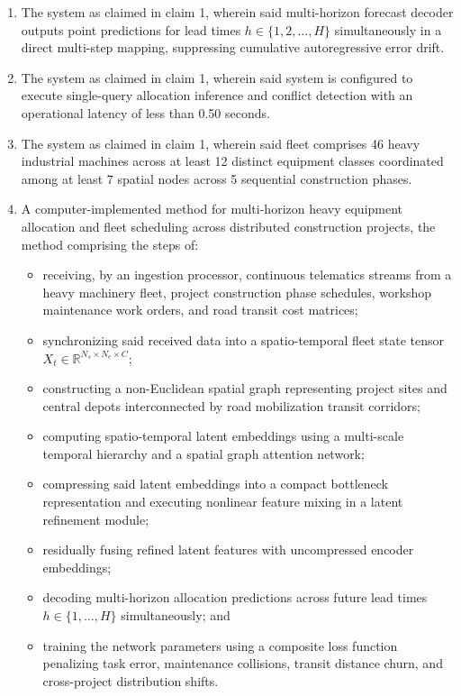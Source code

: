 \documentclass[11pt,a4paper]{article}
\begin{document}
\begin{enumerate}
    \item The system as claimed in claim 1, wherein said multi-horizon forecast decoder outputs point predictions for lead times $h \in \{1, 2, \dots, H\}$ simultaneously in a direct multi-step mapping, suppressing cumulative autoregressive error drift.

    \item The system as claimed in claim 1, wherein said system is configured to execute single-query allocation inference and conflict detection with an operational latency of less than 0.50 seconds.

    \item The system as claimed in claim 1, wherein said fleet comprises 46 heavy industrial machines across at least 12 distinct equipment classes coordinated among at least 7 spatial nodes across 5 sequential construction phases.

    \item A computer-implemented method for multi-horizon heavy equipment allocation and fleet scheduling across distributed construction projects, the method comprising the steps of:
    \begin{itemize}
        \item receiving, by an ingestion processor, continuous telematics streams from a heavy machinery fleet, project construction phase schedules, workshop maintenance work orders, and road transit cost matrices;
        \item synchronizing said received data into a spatio-temporal fleet state tensor $X_t \in \mathbb{R}^{N_s \times N_e \times C}$;
        \item constructing a non-Euclidean spatial graph representing project sites and central depots interconnected by road mobilization transit corridors;
        \item computing spatio-temporal latent embeddings using a multi-scale temporal hierarchy and a spatial graph attention network;
        \item compressing said latent embeddings into a compact bottleneck representation and executing nonlinear feature mixing in a latent refinement module;
        \item residually fusing refined latent features with uncompressed encoder embeddings;
        \item decoding multi-horizon allocation predictions across future lead times $h \in \{1, \dots, H\}$ simultaneously; and
        \item training the network parameters using a composite loss function penalizing task error, maintenance collisions, transit distance churn, and cross-project distribution shifts.
    \end{itemize}


\end{enumerate}
\end{document}
